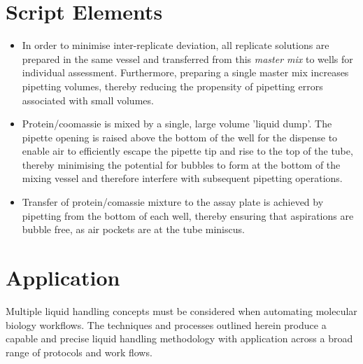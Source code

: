\documentclass{article}
\newcommand{\Ypoint}{\item[\color{yellow}\textbullet]}
\begin{document}
\section{Script Elements}
\begin{itemize}
\Ypoint{In order to minimise inter-replicate deviation, all replicate solutions are prepared in the same vessel and transferred from this \textit{master mix} to wells for individual assessment.  Furthermore, preparing a single master mix increases pipetting volumes, thereby reducing the propensity of pipetting errors associated with small volumes.}

\Ypoint{Protein/coomassie is mixed by a single, large volume 'liquid dump'.  The pipette opening is raised above the bottom of the well for the dispense to enable air to efficiently escape the pipette tip and rise to the top of the tube, thereby minimising the potential for bubbles to form at the bottom of the mixing vessel and therefore interfere with subsequent pipetting operations.}  

\Ypoint{Transfer of protein/comassie mixture to the assay plate is achieved by pipetting from the bottom of each well, thereby ensuring that aspirations are bubble free, as air pockets are at the tube miniscus.}
\end{itemize}

\section{Application}
Multiple liquid handling concepts must be considered when automating molecular biology workflows.  The techniques and processes outlined herein produce a capable and precise liquid handling methodology with application across a broad range of protocols and work flows. 

\end{document}
